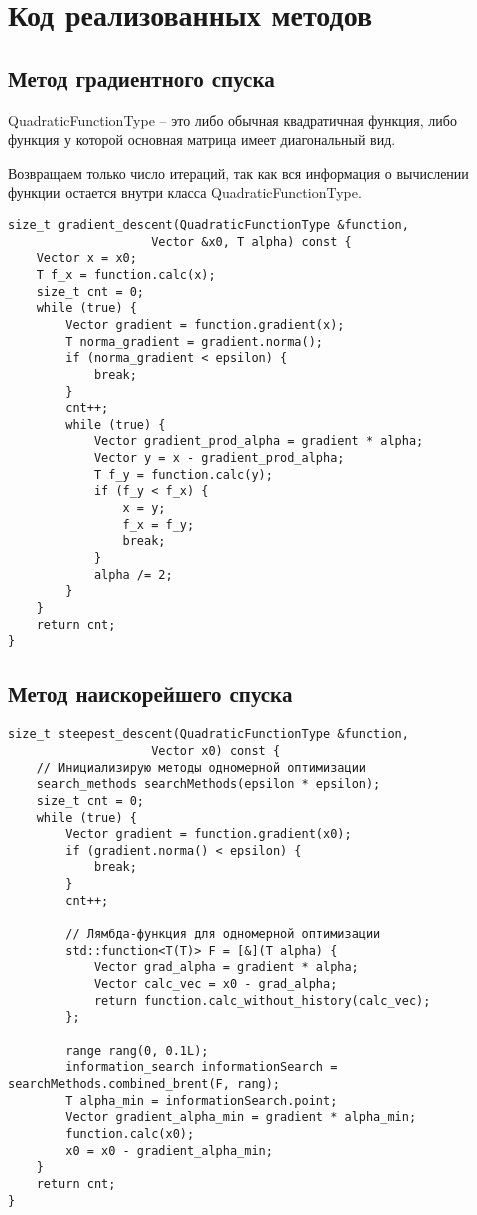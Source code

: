 \newpage
\section{Код реализованных методов}

\subsection{Метод градиентного спуска}
QuadraticFunctionType -- это либо обычная квадратичная функция,
 либо функция у которой основная матрица имеет диагональный вид.

 Возвращаем только число итераций, так как вся информация о вычислении
 функции остается внутри класса QuadraticFunctionType.

\begin{lstlisting}
size_t gradient_descent(QuadraticFunctionType &function,
                    Vector &x0, T alpha) const {
    Vector x = x0;
    T f_x = function.calc(x);
    size_t cnt = 0;
    while (true) {
        Vector gradient = function.gradient(x);
        T norma_gradient = gradient.norma();
        if (norma_gradient < epsilon) {
            break;
        }
        cnt++;
        while (true) {
            Vector gradient_prod_alpha = gradient * alpha;
            Vector y = x - gradient_prod_alpha;
            T f_y = function.calc(y);
            if (f_y < f_x) {
                x = y;
                f_x = f_y;
                break;
            }
            alpha /= 2;
        }
    }
    return cnt;
}
\end{lstlisting}

\newpage


\subsection{Метод наискорейшего спуска}

\begin{lstlisting}
size_t steepest_descent(QuadraticFunctionType &function,
                    Vector x0) const {
    // Инициализирую методы одномерной оптимизации
    search_methods searchMethods(epsilon * epsilon); 
    size_t cnt = 0;
    while (true) {
        Vector gradient = function.gradient(x0);
        if (gradient.norma() < epsilon) {
            break;
        }
        cnt++;

        // Лямбда-функция для одномерной оптимизации
        std::function<T(T)> F = [&](T alpha) {
            Vector grad_alpha = gradient * alpha;
            Vector calc_vec = x0 - grad_alpha;
            return function.calc_without_history(calc_vec);
        };

        range rang(0, 0.1L);
        information_search informationSearch = searchMethods.combined_brent(F, rang);
        T alpha_min = informationSearch.point;
        Vector gradient_alpha_min = gradient * alpha_min;
        function.calc(x0);
        x0 = x0 - gradient_alpha_min;
    }
    return cnt;
}


\end{lstlisting}


